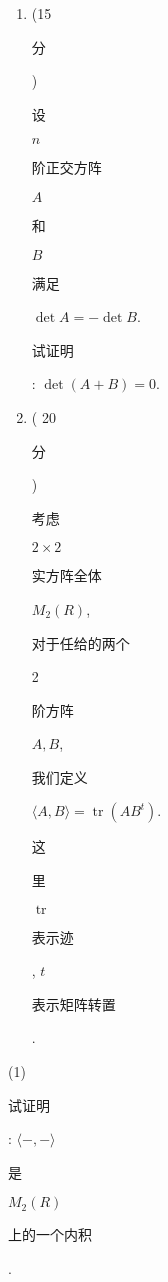\documentclass[10pt]{article}
\begin{document}
\begin{enumerate}
  \item (15 \begin{CJK}{UTF8}{mj}分\end{CJK}) \begin{CJK}{UTF8}{mj}设\end{CJK} $n$ \begin{CJK}{UTF8}{mj}阶正交方阵\end{CJK} $A$ \begin{CJK}{UTF8}{mj}和\end{CJK} $B$ \begin{CJK}{UTF8}{mj}满足\end{CJK} $\operatorname{det} A=-\operatorname{det} B$. \begin{CJK}{UTF8}{mj}试证明\end{CJK}: $\operatorname{det}(A+B)=0$.

  \item ( 20 \begin{CJK}{UTF8}{mj}分\end{CJK}) \begin{CJK}{UTF8}{mj}考虑\end{CJK} $2 \times 2$ \begin{CJK}{UTF8}{mj}实方阵全体\end{CJK} $M_{2}(R)$, \begin{CJK}{UTF8}{mj}对于任给的两个\end{CJK} 2 \begin{CJK}{UTF8}{mj}阶方阵\end{CJK} $A, B$, \begin{CJK}{UTF8}{mj}我们定义\end{CJK} $\langle A, B\rangle=\operatorname{tr}\left(A B^{t}\right)$. \begin{CJK}{UTF8}{mj}这\end{CJK} \begin{CJK}{UTF8}{mj}里\end{CJK} $\operatorname{tr}$ \begin{CJK}{UTF8}{mj}表示迹\end{CJK}, $t$ \begin{CJK}{UTF8}{mj}表示矩阵转置\end{CJK}.

\end{enumerate}
(1) \begin{CJK}{UTF8}{mj}试证明\end{CJK}: $\langle-,-\rangle$ \begin{CJK}{UTF8}{mj}是\end{CJK} $M_{2}(R)$ \begin{CJK}{UTF8}{mj}上的一个内积\end{CJK}.
\end{document}
